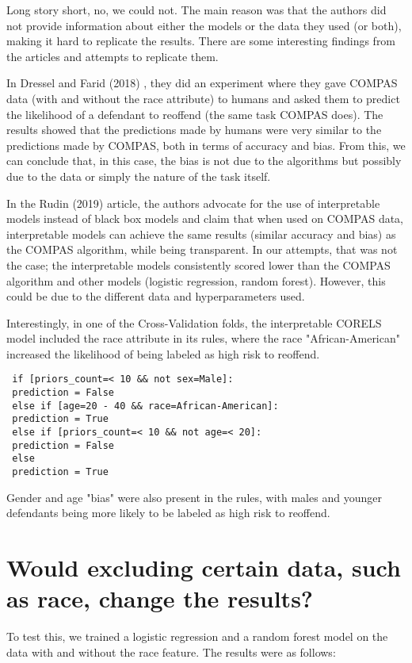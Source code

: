 \documentclass[sigconf,nonacm]{acmart}
\begin{document}
Long story short, no, we could not. The main reason was that the authors did not provide information about either the models or the data they used (or both), making it hard to replicate the results. There are some interesting findings from the articles and attempts to replicate them.

In Dressel and Farid (2018) \cite{dressel2018accuracy}, they did an experiment where they gave COMPAS data (with and without the race attribute) to humans and asked them to predict the likelihood of a defendant to reoffend (the same task COMPAS does). The results showed that the predictions made by humans were very similar to the predictions made by COMPAS, both in terms of accuracy and bias. From this, we can conclude that, in this case, the bias is not due to the algorithms but possibly due to the data or simply the nature of the task itself.

In the Rudin (2019) \cite{rudin2019stop} article, the authors advocate for the use of interpretable models instead of black box models and claim that when used on COMPAS data, interpretable models can achieve the same results (similar accuracy and bias) as the COMPAS algorithm, while being transparent. In our attempts, that was not the case; the interpretable models consistently scored lower than the COMPAS algorithm and other models (logistic regression, random forest). However, this could be due to the different data and hyperparameters used.

Interestingly, in one of the Cross-Validation folds, the interpretable CORELS model included the race attribute in its rules, where the race "African-American" increased the likelihood of being labeled as high risk to reoffend.

{
\small
\begin{verbatim}
 if [priors_count=< 10 && not sex=Male]:
 prediction = False
 else if [age=20 - 40 && race=African-American]:
 prediction = True
 else if [priors_count=< 10 && not age=< 20]:
 prediction = False
 else 
 prediction = True
\end{verbatim}
}
Gender and age "bias" were also present in the rules, with males and younger defendants being more likely to be labeled as high risk to reoffend.

\section{Would excluding certain data, such as race, change the results?}

To test this, we trained a logistic regression and a random forest model on the data with and without the race feature. The results were as follows:
\end{document}
